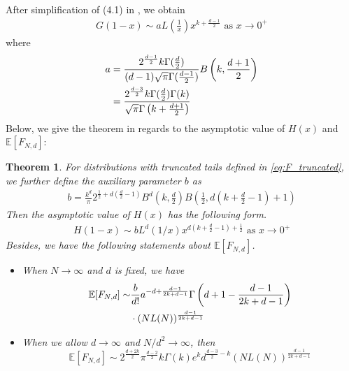 \documentclass[conference,a4paper]{IEEEtran}
\def\E{\mathbb{E}}
\newtheorem{theorem}{Theorem}
\begin{document}
After simplification of (4.1) in \cite{dwyer1991convex}, we obtain
\begin{align}
    G(1-x) \sim a
    L\left(\frac{1}{x} \right)
    x^{k+\frac{d-1}{2}} \textrm{ as } x \to 0^+ 
    \label{eq:truncated_G_1_x}
\end{align}
where
\begin{align}
a &=\frac{2^{\frac{d-1}{2}} k \Gamma(\frac{d}{2})}
    {(d-1) \sqrt{\pi} \Gamma(\frac{d-1}{2})}
    B\left(k, \frac{d+1}{2}\right) \notag \\
    &= \frac{2^{\frac{d-3}{2}} k \Gamma(\frac{d}{2})\Gamma(k)}
    {\sqrt{\pi} \Gamma\left(k+\frac{d+1}{2}\right)}
    \label{eq:a}
\end{align}
Below, we give the theorem in regards to the asymptotic value of $H(x)$ and $\E[F_{N,d}]$:
\begin{theorem}\label{thm:truncated_tails}
     For distributions with truncated tails
     defined in \eqref{eq:F_truncated}, we further define
     the auxiliary parameter $b$ as
     \begin{align}
          b =  \frac{k^d}{\pi}
          2^{\frac{1}{2} + d(\frac{d}{2}-1)} B^d\left(k, \frac{d}{2}\right)
          B\left( \frac{1}{2},
          d\left(k+\frac{d}{2} -1 \right)+1 \right)
          \label{eq:b}
      \end{align}
      Then the asymptotic value of $H(x)$ has the following form.
      \begin{align}
          H(1-x)  \sim b
          L^d(1/x) x^{d(k+\frac{d}{2}-1)+\frac{1}{2}} 
          \textrm{ as } x \to 0^+ \label{eq:truncated_H_1_x}
     \end{align}     
     Besides, we have
 the following statements about $\E[F_{N,d}]$.
\begin{itemize}
     \item When $N\to \infty$ and $d$ is fixed, we have
     \begin{align}\label{eq:efn_truncated_formula}
          \E[F_{N,d}] \sim &\frac{b}{d!}a^{-d+\frac{d-1}{2k+d-1}}
          \Gamma 
          \left(d+1-\frac{d-1}{2k+d-1}\right)
          \notag\\
          &\cdot (NL(N))^{\frac{d-1}{2k+d-1}}
      \end{align}
     \item  When we allow $d\to \infty$ and $N/d^2 \to \infty$, then
     \begin{equation}\label{eq:truncated_d_inf}
      \E[F_{N,d}] \sim 2^{\frac{d+2k}{2}}\pi^{\frac{d-2}{2}} k\Gamma(k)e^k d^{\frac{d-3}{2}-k}
      (NL(N))^{\frac{d-1}{2k+d-1}}
     \end{equation}    
\end{itemize}
\end{theorem}
\end{document}
